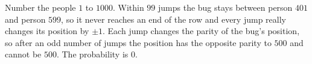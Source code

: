 Number the people $1$ to $1000$. Within $99$ jumps the bug stays between person $401$ and person $599$, so it never reaches an end of the row and every jump really changes its position by $\pm1$. Each jump changes the parity of the bug's position, so after an odd number of jumps the position has the opposite parity to $500$ and cannot be $500$. The probability is $\boxed{0}$.
